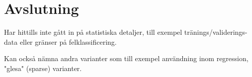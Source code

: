 \documentclass[a4paper, 12pt]{report}
\theoremstyle{definition}
\theoremstyle{remark}
\begin{document}
\chapter{Avslutning}
Har hittills inte gått in på statistiska detaljer, till exempel tränings/validerings-data eller gränser på felklassificering.

Kan också nämna andra varianter som till exempel användning inom regression, "glesa" (sparse) varianter.



\end{document}
